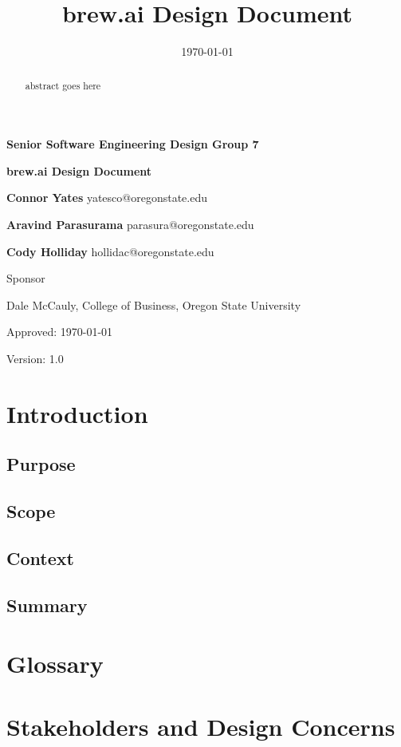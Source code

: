 \documentclass[draftclsnofoot,onecolumn,letterpaper,10pt]{IEEEtran}
\date{\today}
\title{brew.ai Design Document}
\begin{document}
{\huge\textbf{Senior Software Engineering Design Group 7}}
	\vspace{1cm}

{\Huge\textbf{brew.ai Design Document}}

\vspace{2cm}
\textbf{Connor Yates} yatesco@oregonstate.edu

\textbf{Aravind Parasurama} parasura@oregonstate.edu

\textbf{Cody Holliday} hollidac@oregonstate.edu

\vspace{2cm}
Sponsor

Dale McCauly, College of Business, Oregon State University

\vspace{0.5cm}
	Approved: \today{}

	Version: 1.0


\newpage
\begin{abstract}
	abstract goes here
\end{abstract}
\newpage
\tableofcontents
\newpage
\section{Introduction}
\subsection{Purpose}
\subsection{Scope}
\subsection{Context}
\subsection{Summary}

\section{Glossary}

\section{Stakeholders and Design Concerns}
\end{document}
